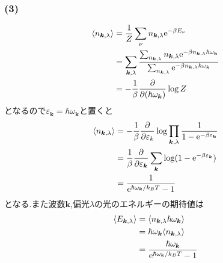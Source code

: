 \documentclass[uplatex,a4j,11pt,dvipdfmx]{jsarticle}
\begin{document}
\subsubsection*{(3)}
\begin{align}
  \begin{split}
    \langle n_{\bm{k},\lambda}\rangle&=\frac{1}{Z}\sum_{\nu}n_{\bm{k},\lambda}{\rm e}^{-\beta E_\nu}\\
    &=\sum_{\bm{k},\lambda}\frac{\sum_{n_{\bm{k},\lambda}}n_{\bm{k},\lambda}{\rm e}^{-\beta n_{\bm{k},\lambda}\hbar\omega_{\bm{k}}}}{\sum_{n_{\bm{k},\lambda}}{\rm e}^{-\beta n_{\bm{k},\lambda}\hbar\omega_{\bm{k}}}}\\
    &=-\frac{1}{\beta}\frac{\partial}{\partial(\hbar\omega_{\bm{k}})}\log Z
  \end{split}
\end{align}
となるので$\varepsilon_{\bm{k}}=\hbar\omega_{\bm{k}}$と置くと
\begin{align}
  \begin{split}
    \langle n_{{\bm{k}},\lambda}\rangle&=-\frac{1}{\beta}\frac{\partial}{\partial \varepsilon_k}\log\prod_{{\bm{k}},\lambda}\frac{1}{1-{\rm e}^{-\beta\varepsilon_{\bm{k}}}}\\
    &=\frac{1}{\beta}\frac{\partial}{\partial\varepsilon_{\bm{k}}}\sum_{\bm{k}}\log(1-{\rm e}^{-\beta\varepsilon_{\bm{k}}})\\
    &=\frac{1}{{\rm e}^{\hbar\omega_{\bm{k}}/k_BT}-1}
  \end{split}
\end{align}
となる.また波数${\bm{k}}$,偏光$\lambda$の光のエネルギーの期待値は
\begin{align}
  \begin{split}
    \langle E_{{\bm{k}},\lambda}\rangle&=\langle n_{{\bm{k}},\lambda}\hbar\omega_{\bm{k}}\rangle\\
    &=\hbar\omega_{\bm{k}}\langle n_{{\bm{k}},\lambda}\rangle\\
    &=\frac{\hbar\omega_{\bm{k}}}{{\rm e}^{\hbar\omega_{\bm{k}}/k_BT}-1}
  \end{split}
\end{align}
\end{document}
